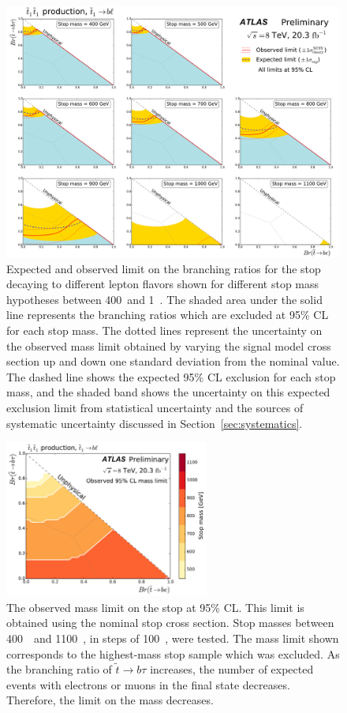 \begin{figure}[ht]
  \centering
  \includegraphics[width=\textwidth]{figs/blstop/limit_contours.pdf}
  \caption{Expected and observed limit on the branching ratios for the stop
    decaying to different lepton flavors shown for different stop mass
    hypotheses between 400~\GeV and 1~\TeV. The shaded area under the solid
    line represents the branching ratios which are excluded at 95\% CL
    for each stop mass.
    The dotted lines represent the uncertainty on the observed mass limit
    obtained by varying the signal model cross section up and down one standard
    deviation from the nominal value. The dashed line shows the
    expected 95\% CL exclusion for each stop mass, and the shaded band shows
    the uncertainty on this expected exclusion limit from statistical
    uncertainty and the sources of systematic uncertainty discussed in
    Section~\ref{sec:systematics}.
  }
  \label{fig:limit_contours}
\end{figure}

\begin{figure}[ht]
  \centering
  \includegraphics[width=0.6\textwidth]{figs/blstop/mass_limit_contours_no_extras_obs.pdf}
  \caption{The observed mass limit on the stop at 95\% CL.
    This limit is obtained using the nominal stop cross section.
    Stop masses between 400~\GeV\ and 1100~\GeV, in steps of 100~\GeV, were
    tested. The mass limit shown corresponds to the highest-mass stop sample
    which was excluded.
    As the branching ratio of $\tilde{t} \rightarrow b\tau$ increases, the
    number of expected events with electrons or muons in the final state
    decreases. Therefore, the limit on the mass decreases.
  }
  \label{fig:mass_limit_obs}
\end{figure}

